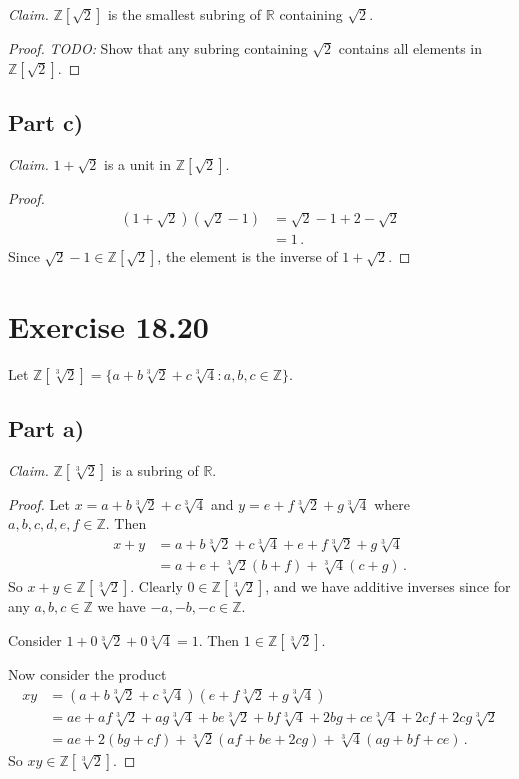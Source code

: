 \documentclass{abrice}
\newcommand{\Z}{\mathbb{Z}}
\newcommand{\R}{\mathbb{R}}
\begin{document}
\emph{Claim.} $\Z[\sqrt 2]$ is the smallest subring of $\R$ containing $\sqrt
2$.

\begin{proof}
  \emph{TODO:} Show that any subring containing $\sqrt 2$ contains all elements
  in $\Z[\sqrt 2]$.
\end{proof}

\subsection{Part c)}

\emph{Claim.} $1 + \sqrt 2$ is a unit in $\Z[\sqrt 2]$.

\begin{proof}
  \begin{align*}
    (1 + \sqrt 2)(\sqrt 2 - 1)
    &= \sqrt 2 - 1 + 2 - \sqrt 2 \\
    &= 1\, .
  \end{align*}
  Since $\sqrt 2 - 1 \in \Z[\sqrt 2]$, the element is the inverse of $1 + \sqrt 2$.
\end{proof}

\section{Exercise 18.20}

Let $\Z[\sqrt[3]{2}] = \{ a + b \sqrt[3]{2} + c \sqrt[3]{4} : a,b,c \in \Z \}$.

\subsection{Part a)}

\emph{Claim.} $\Z[\sqrt[3]{2}]$ is a subring of $\R$.

\begin{proof}
  Let $x = a + b \sqrt[3]{2} + c \sqrt[3]{4}$ and $y = e + f \sqrt[3]{2} + g
  \sqrt[3]{4}$ where $a,b,c,d,e,f \in \Z$. Then
  \begin{align*}
    x + y
    &= a + b \sqrt[3]{2} + c \sqrt[3]{4} + e + f \sqrt[3]{2} + g \sqrt[3]{4} \\
    &= a + e + \sqrt[3]{2}(b + f) + \sqrt[3]{4}(c + g)\, .
  \end{align*}
  So $x + y \in \Z[\sqrt[3]{2}]$. Clearly $0 \in \Z[\sqrt[3]{2}]$, and we have
  additive inverses since for any $a,b,c \in \Z$ we have $-a,-b,-c \in \Z$.

  Consider $1 + 0\sqrt[3]{2} + 0\sqrt[3]{4} = 1$. Then $1 \in \Z[\sqrt[3]{2}]$.

  Now consider the product
  \begin{align*}
    xy
    &= (a + b \sqrt[3]{2} + c \sqrt[3]{4})(e + f \sqrt[3]{2} + g \sqrt[3]{4}) \\
    &= ae + af \sqrt[3]{2} + ag \sqrt[3]{4} + be \sqrt[3]{2} + bf \sqrt[3]{4}
      + 2bg + ce \sqrt[3]{4} + 2cf + 2cg \sqrt[3]{2} \\
    &= ae + 2(bg + cf) + \sqrt[3]{2} (af + be + 2cg) + \sqrt[3]{4} (ag + bf + ce)\, .
  \end{align*}
  So $xy \in \Z[\sqrt[3]{2}]$.
\end{proof}
\end{document}
